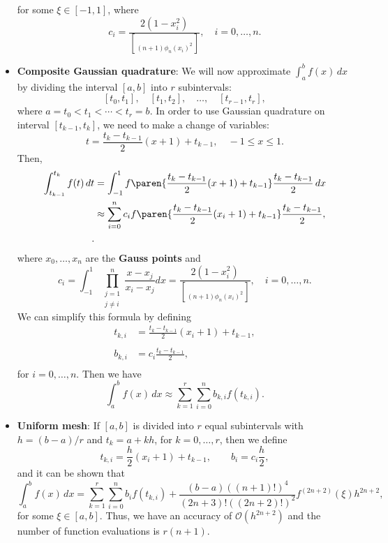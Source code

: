 \documentclass{report}
\begin{document}
\begin{itemize}
            for some $\xi \in [-1,1]$, where
            $$ c_i = \frac{2(1 - x_i^2)}{\brack{(n+1)\phi_n(x_i)}^2}, \quad i=0,\ldots,n. $$
        \item \textbf{Composite Gaussian quadrature}:
            We will now approximate $\int_a^b f(x)\,dx$ by dividing the interval $[a,b]$ into $r$  subintervals:
            $$[t_0,t_1], \quad [t_1,t_2], \quad \ldots, \quad [t_{r-1},t_r],$$
            where $a = t_0 < t_1 < \cdots < t_r = b$.
            \bigbreak \noindent 
            In order to use Gaussian quadrature on interval $[t_{k-1},t_k]$, we need to make a change of variables:
            $$ t = \frac{t_k - t_{k-1}}{2} (x + 1) + t_{k-1}, \quad -1 \leq x \leq 1. $$
            Then,
            \begin{align*}
                \int_{t_{k-1}}^{t_k} f(t)\,dt 
&= \int_{-1}^1 f\paren{\frac{t_k - t_{k-1}}{2} (x + 1) + t_{k-1}} \frac{t_k - t_{k-1}}{2}\,dx \\
&\approx \sum_{i=0}^n c_i f\paren{\frac{t_k - t_{k-1}}{2} (x_i + 1) + t_{k-1}} \frac{t_k - t_{k-1}}{2},\\
            .\end{align*}
            where $x_0,\ldots,x_n$ are the \textbf{Gauss points} and 
            $$c_i = \int_{-1}^1 \prod_{\substack{j = 1 \\ j \neq i}}^n \frac{x - x_j}{x_i - x_j} dx = \frac{2(1 - x_i^2)}{\brack{(n+1)\phi_n(x_i)}^2}, \quad i = 0,\ldots,n.$$
            \bigbreak \noindent 
            We can simplify this formula by defining
            \begin{align*}
                t_{k,i} &= \frac{t_k - t_{k-1}}{2} (x_i + 1) + t_{k-1}, \\
                \\
                b_{k,i} &= c_i \frac{t_k - t_{k-1}}{2}, \\
            \end{align*}
            for $i = 0,\ldots,n$.
            \bigbreak \noindent 
            Then we have
            $$\int_a^b f(x)\, dx \approx \sum_{k=1}^r \sum_{i=0}^n b_{k,i} f(t_{k,i}).$$
        \item \textbf{Uniform mesh}: 
            If $[a,b]$ is divided into $r$ equal subintervals with $h = (b - a)/r$ and $t_k = a + kh$, for $k = 0, \ldots, r$, then we define
            $$
            t_{k,i} = \frac{h}{2} (x_i + 1) + t_{k-1}, \qquad b_i = c_i \frac{h}{2},
            $$
            and it can be shown that 
            $$\int_a^b f(x)\, dx = \sum_{k=1}^r \sum_{i=0}^n b_i f(t_{k,i}) + \frac{(b - a)((n+1)!)^4}{(2n+3)!((2n+2)!)^2} f^{(2n+2)}(\xi) h^{2n+2},$$
            for some $\xi \in [a,b]$.
            Thus, we have an accuracy of $\mathcal{O}(h^{2n+2})$ and the number of function evaluations is $r(n+1)$.
    \end{itemize}

















    
\end{document}
